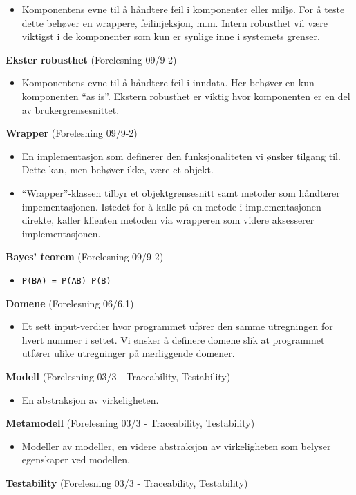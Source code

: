 \begin{itemize}
\item
  Komponentens evne til å håndtere feil i komponenter eller miljø. For å
  teste dette behøver en wrappere, feilinjeksjon, m.m. Intern robusthet
  vil være viktigst i de komponenter som kun er synlige inne i systemets
  grenser.
\end{itemize}
\textbf{Ekster robusthet} (Forelesning 09/9-2)

\begin{itemize}
\item
  Komponentens evne til å håndtere feil i inndata. Her behøver en kun
  komponenten ``as is''. Ekstern robusthet er viktig hvor komponenten er
  en del av brukergrensesnittet.
\end{itemize}
\textbf{Wrapper} (Forelesning 09/9-2)

\begin{itemize}
\item
  En implementasjon som definerer den funksjonaliteten vi ønsker tilgang
  til. Dette kan, men behøver ikke, være et objekt.
\item
  ``Wrapper''-klassen tilbyr et objektgrensesnitt samt metoder som
  håndterer impementasjonen. Istedet for å kalle på en metode i
  implementasjonen direkte, kaller klienten metoden via wrapperen som
  videre aksesserer implementasjonen.
\end{itemize}
\textbf{Bayes' teorem} (Forelesning 09/9-2)

\begin{itemize}
\item
  \texttt{P(B\textbar{}A) = P(A\textbar{}B) P(B)}
\end{itemize}
\textbf{Domene} (Forelesning 06/6.1)

\begin{itemize}
\item
  Et sett input-verdier hvor programmet ufører den samme utregningen for
  hvert nummer i settet. Vi ønsker å definere domene slik at programmet
  utfører ulike utregninger på nærliggende domener.
\end{itemize}
\textbf{Modell} (Forelesning 03/3 - Traceability, Testability)

\begin{itemize}
\item
  En abstraksjon av virkeligheten.
\end{itemize}
\textbf{Metamodell} (Forelesning 03/3 - Traceability, Testability)

\begin{itemize}
\item
  Modeller av modeller, en videre abstraksjon av virkeligheten som
  belyser egenskaper ved modellen.
\end{itemize}
\textbf{Testability} (Forelesning 03/3 - Traceability, Testability)

